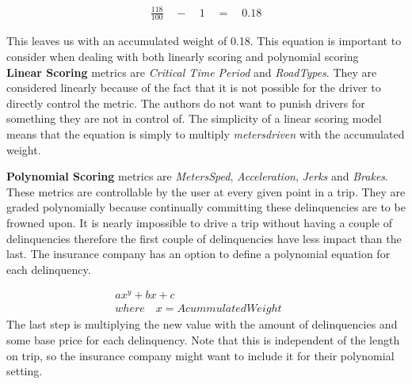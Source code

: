 \begin{align*}
\frac { 118 }{ 100 } \quad -\quad 1\quad =\quad 0.18
\end{align*}


This leaves us with an accumulated weight of 0.18. This equation is important to consider when dealing with both linearly scoring and polynomial scoring\\

\textbf{Linear Scoring} metrics are \textit{Critical Time Period} and \textit{RoadTypes}. They are considered linearly because of the fact that it is not possible for the driver to directly control the metric. The authors do not want to punish drivers for something they are not in control of. 
The simplicity of a linear scoring model means that the equation is simply to multiply \textit{metersdriven} with the accumulated weight.

\textbf{Polynomial Scoring} metrics are \textit{MetersSped}, \textit{Acceleration}, \textit{Jerks} and \textit{Brakes}. These metrics are controllable by the user at every given point in a trip. They are graded polynomially because continually committing these delinquencies are to be frowned upon. It is nearly impossible to drive a trip without having a couple of delinquencies therefore the first couple of delinquencies have less impact than the last. The insurance company has an option to define a polynomial equation for each delinquency.

\begin{align*}
ax^{y} + bx + c\quad \quad \quad \quad \quad \quad \quad \quad \quad \quad \quad \\
where\quad x = AcummulatedWeight
\end{align*}
The last step is multiplying the new value with the amount of delinquencies and some base price for each delinquency. Note that this is independent of the length on trip, so the insurance company might want to include it for their polynomial setting.
